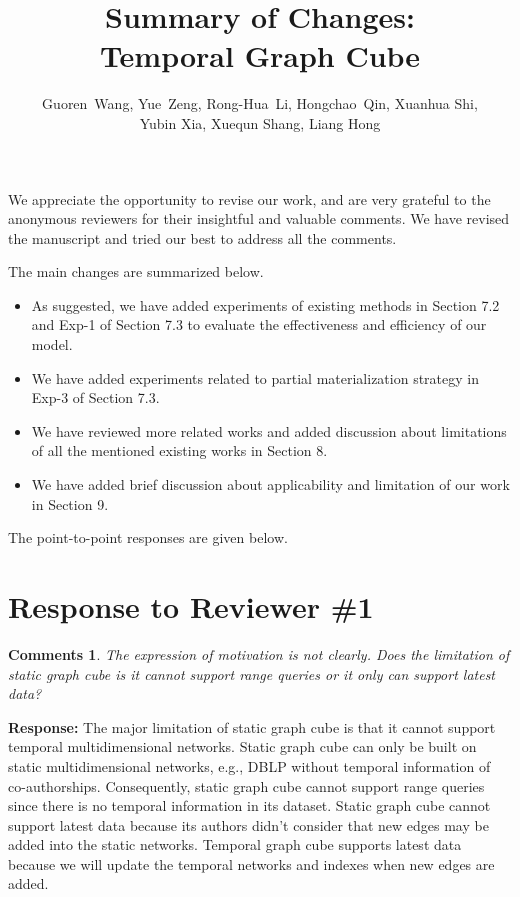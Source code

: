 \documentclass{article}
\title{Summary of Changes: \\Temporal Graph Cube}
\author{Guoren~Wang,
	Yue~Zeng,
	Rong-Hua~Li,
	Hongchao~Qin,
	Xuanhua Shi,\\
	Yubin Xia, 
	Xuequn Shang, 
	Liang Hong
}
\date{}
\newtheorem{Comments}{\textbf{Comments}}
\begin{document}
\maketitle

We appreciate the opportunity to revise our work, and are very grateful to the anonymous reviewers for their insightful and valuable comments. We have revised the manuscript and tried our best to address all the comments. 

The main changes are summarized below.
\begin{itemize}

\item As suggested, we have added experiments of existing methods in Section 7.2 and Exp-1 of Section 7.3 to evaluate the effectiveness and efficiency of our model.
\item We have added experiments related to partial materialization strategy in Exp-3 of Section 7.3.
\item We have reviewed more related works and added discussion about limitations of all the mentioned existing works in Section 8.
\item We have added brief discussion about applicability and limitation of our work in Section 9.

\end{itemize}

The point-to-point responses are given below.
	
\section{Response to Reviewer \#1}
\begin{Comments}
The expression of motivation is not clearly. Does the limitation of static graph cube is it cannot support range queries or it only can support latest data?
\end{Comments}
\noindent \textbf{Response:} The major limitation of static graph cube is that it cannot support temporal multidimensional networks. Static graph cube can only be built on static multidimensional networks, e.g., DBLP without temporal information of co-authorships. Consequently, static graph cube cannot support range queries since there is no temporal information in its dataset. Static graph cube cannot support latest data because its authors didn't consider that new edges may be added into the static networks. Temporal graph cube supports latest data because we will update the temporal networks and indexes when new edges are added.
\end{document}
